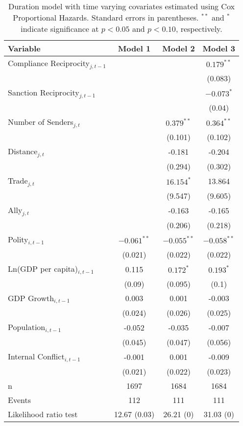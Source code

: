 \begin{table}[ht]
\centering
{\normalsize
\begin{tabular}{lccc}
 Variable & Model 1 & Model 2 & Model 3 \\ 
  \hline
\hline
Compliance Reciprocity$_{j,t-1}$ &  &  & $0.179^{\ast\ast}$ \\ 
   &  &  & (0.083) \\ 
  Sanction Reciprocity$_{j,t-1}$ &  &  & $-0.073^{\ast}$ \\ 
   &  &  & (0.04) \\ 
   \hline
Number of Senders$_{j,t}$ &  & $0.379^{\ast\ast}$ & $0.364^{\ast\ast}$ \\ 
   &  & (0.101) & (0.102) \\ 
  Distance$_{j,t}$ &  & -0.181 & -0.204 \\ 
   &  & (0.294) & (0.302) \\ 
  Trade$_{j,t}$ &  & $16.154^{\ast}$ & 13.864 \\ 
   &  & (9.547) & (9.605) \\ 
  Ally$_{j,t}$ &  & -0.163 & -0.165 \\ 
   &  & (0.206) & (0.218) \\ 
   \hline
Polity$_{i,t-1}$ & $-0.061^{\ast\ast}$ & $-0.055^{\ast\ast}$ & $-0.058^{\ast\ast}$ \\ 
   & (0.021) & (0.022) & (0.022) \\ 
  Ln(GDP per capita)$_{i,t-1}$ & 0.115 & $0.172^{\ast}$ & $0.193^{\ast}$ \\ 
   & (0.09) & (0.095) & (0.1) \\ 
  GDP Growth$_{i,t-1}$ & 0.003 & 0.001 & -0.003 \\ 
   & (0.024) & (0.026) & (0.025) \\ 
  Population$_{i,t-1}$ & -0.052 & -0.035 & -0.007 \\ 
   & (0.045) & (0.047) & (0.056) \\ 
  Internal Conflict$_{i,t-1}$ & -0.001 & 0.001 & -0.009 \\ 
   & (0.021) & (0.022) & (0.023) \\ 
   \hline
n & 1697 & 1684 & 1684 \\ 
  Events & 112 & 111 & 111 \\ 
  Likelihood ratio test & 12.67 (0.03) & 26.21 (0) & 31.03 (0) \\ 
   \hline
\hline
\end{tabular}
}
\caption{Duration model with time varying covariates estimated using Cox Proportional Hazards. Standard errors in parentheses. $^{**}$ and $^{*}$ indicate significance at $p< 0.05 $ and $p< 0.10 $, respectively.} 
\label{tab:regResults}
\end{table}
